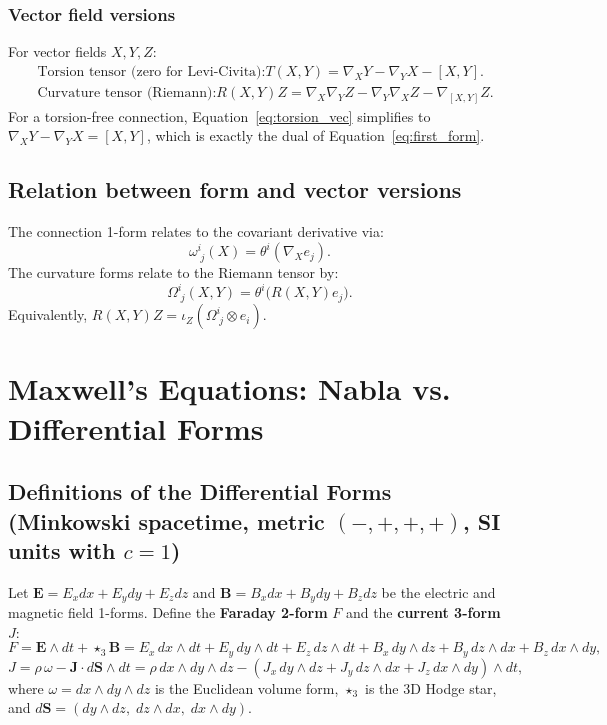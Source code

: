 \documentclass[12pt]{article}
\begin{document}
\subsubsection*{Vector field versions}
For vector fields \(X,Y,Z\):
\begin{align}
	&\text{Torsion tensor (zero for Levi-Civita):} 
	T(X,Y) = \nabla_X Y - \nabla_Y X - [X,Y]. \label{eq:torsion_vec} \\
	&\text{Curvature tensor (Riemann):} 
	R(X,Y)Z = \nabla_X\nabla_Y Z - \nabla_Y\nabla_X Z - \nabla_{[X,Y]}Z. \label{eq:curv_vec}
\end{align}
For a torsion-free connection, Equation~\eqref{eq:torsion_vec} simplifies to \(\nabla_X Y - \nabla_Y X = [X,Y]\), which is exactly the dual of Equation~\eqref{eq:first_form}.

\subsection*{Relation between form and vector versions}
The connection 1-form relates to the covariant derivative via:
\[
\omega^i_{\;j}(X) = \theta^i(\nabla_X e_j).
\]
The curvature forms relate to the Riemann tensor by:
\[
\Omega^i_{\;j}(X,Y) = \theta^i\bigl( R(X,Y) e_j \bigr).
\]
Equivalently, \(R(X,Y)Z = \iota_Z(\Omega^i_{\;j} \otimes e_i)\).


\newpage


\section*{Maxwell's Equations: Nabla vs. Differential Forms}
\vspace{-0.5em}

\subsection*{Definitions of the Differential Forms (Minkowski spacetime, metric \((-,+,+,+)\), SI units with \(c=1\))}

Let \(\mathbf{E} = E_x dx + E_y dy + E_z dz\) and \(\mathbf{B} = B_x dx + B_y dy + B_z dz\) be the electric and magnetic field 1-forms. Define the \textbf{Faraday 2-form} \(F\) and the \textbf{current 3-form} \(J\):
\[
F = \mathbf{E} \wedge dt + \star_3\mathbf{B} 
= E_x\, dx\wedge dt + E_y\, dy\wedge dt + E_z\, dz\wedge dt
+ B_x\, dy\wedge dz + B_y\, dz\wedge dx + B_z\, dx\wedge dy,
\]
\[
J = \rho\, \omega - \mathbf{J}\cdot d\mathbf{S}\wedge dt
= \rho\, dx\wedge dy\wedge dz - (J_x\, dy\wedge dz + J_y\, dz\wedge dx + J_z\, dx\wedge dy)\wedge dt,
\]
where \(\omega = dx\wedge dy\wedge dz\) is the Euclidean volume form, \(\star_3\) is the 3D Hodge star, and \(d\mathbf{S} = (dy\wedge dz,\; dz\wedge dx,\; dx\wedge dy)\).
\end{document}

